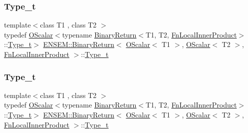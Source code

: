\subsubsection{\texorpdfstring{Type\_t}{Type\_t}\hspace{0.1cm}{\footnotesize\ttfamily [2/3]}}
{\footnotesize\ttfamily template$<$class T1 , class T2 $>$ \\
typedef \mbox{\hyperlink{classENSEM_1_1OScalar}{O\+Scalar}}$<$typename \mbox{\hyperlink{structENSEM_1_1BinaryReturn}{Binary\+Return}}$<$T1, T2, \mbox{\hyperlink{structENSEM_1_1FnLocalInnerProduct}{Fn\+Local\+Inner\+Product}}$>$\+::\mbox{\hyperlink{structENSEM_1_1BinaryReturn_3_01OScalar_3_01T1_01_4_00_01OScalar_3_01T2_01_4_00_01FnLocalInnerProduct_01_4_a96c2eb7ff0bb862f8f194a8170dac35a}{Type\+\_\+t}}$>$ \mbox{\hyperlink{structENSEM_1_1BinaryReturn}{E\+N\+S\+E\+M\+::\+Binary\+Return}}$<$ \mbox{\hyperlink{classENSEM_1_1OScalar}{O\+Scalar}}$<$ T1 $>$, \mbox{\hyperlink{classENSEM_1_1OScalar}{O\+Scalar}}$<$ T2 $>$, \mbox{\hyperlink{structENSEM_1_1FnLocalInnerProduct}{Fn\+Local\+Inner\+Product}} $>$\+::\mbox{\hyperlink{structENSEM_1_1BinaryReturn_3_01OScalar_3_01T1_01_4_00_01OScalar_3_01T2_01_4_00_01FnLocalInnerProduct_01_4_a96c2eb7ff0bb862f8f194a8170dac35a}{Type\+\_\+t}}}

\mbox{\label{structENSEM_1_1BinaryReturn_3_01OScalar_3_01T1_01_4_00_01OScalar_3_01T2_01_4_00_01FnLocalInnerProduct_01_4_a96c2eb7ff0bb862f8f194a8170dac35a}} 
\subsubsection{\texorpdfstring{Type\_t}{Type\_t}\hspace{0.1cm}{\footnotesize\ttfamily [3/3]}}
{\footnotesize\ttfamily template$<$class T1 , class T2 $>$ \\
typedef \mbox{\hyperlink{classENSEM_1_1OScalar}{O\+Scalar}}$<$typename \mbox{\hyperlink{structENSEM_1_1BinaryReturn}{Binary\+Return}}$<$T1, T2, \mbox{\hyperlink{structENSEM_1_1FnLocalInnerProduct}{Fn\+Local\+Inner\+Product}}$>$\+::\mbox{\hyperlink{structENSEM_1_1BinaryReturn_3_01OScalar_3_01T1_01_4_00_01OScalar_3_01T2_01_4_00_01FnLocalInnerProduct_01_4_a96c2eb7ff0bb862f8f194a8170dac35a}{Type\+\_\+t}}$>$ \mbox{\hyperlink{structENSEM_1_1BinaryReturn}{E\+N\+S\+E\+M\+::\+Binary\+Return}}$<$ \mbox{\hyperlink{classENSEM_1_1OScalar}{O\+Scalar}}$<$ T1 $>$, \mbox{\hyperlink{classENSEM_1_1OScalar}{O\+Scalar}}$<$ T2 $>$, \mbox{\hyperlink{structENSEM_1_1FnLocalInnerProduct}{Fn\+Local\+Inner\+Product}} $>$\+::\mbox{\hyperlink{structENSEM_1_1BinaryReturn_3_01OScalar_3_01T1_01_4_00_01OScalar_3_01T2_01_4_00_01FnLocalInnerProduct_01_4_a96c2eb7ff0bb862f8f194a8170dac35a}{Type\+\_\+t}}}




